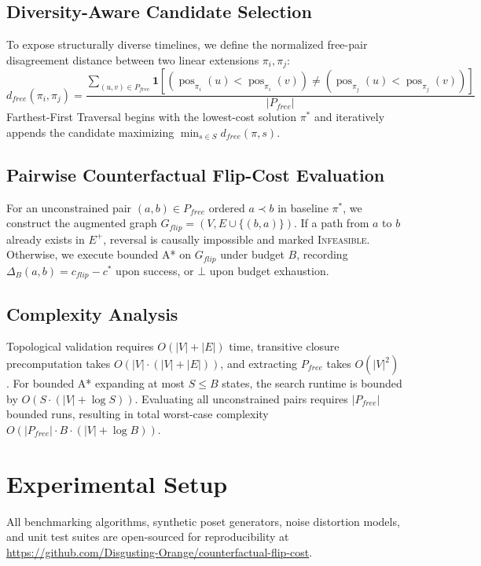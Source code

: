 \documentclass[journal]{IEEEtran}
\DeclareMathOperator{\pos}{pos}
\begin{document}
\subsection{Diversity-Aware Candidate Selection}
To expose structurally diverse timelines, we define the normalized free-pair disagreement distance between two linear extensions $\pi_i, \pi_j$:
\begin{equation}
d_{free}(\pi_i, \pi_j) = \frac{\sum_{(u, v) \in P_{free}} \mathbf{1}\left[ (\pos_{\pi_i}(u) < \pos_{\pi_i}(v)) \neq (\pos_{\pi_j}(u) < \pos_{\pi_j}(v)) \right]}{|P_{free}|}
\end{equation}
Farthest-First Traversal begins with the lowest-cost solution $\pi^*$ and iteratively appends the candidate maximizing $\min_{s \in S} d_{free}(\pi, s)$.

\subsection{Pairwise Counterfactual Flip-Cost Evaluation}
For an unconstrained pair $(a, b) \in P_{free}$ ordered $a \prec b$ in baseline $\pi^*$, we construct the augmented graph $G_{flip} = (V, E \cup \{(b, a)\})$. If a path from $a$ to $b$ already exists in $E^+$, reversal is causally impossible and marked \textsc{Infeasible}. Otherwise, we execute bounded A* on $G_{flip}$ under budget $B$, recording $\Delta_B(a, b) = c_{flip} - c^*$ upon success, or $\bot$ upon budget exhaustion.

\subsection{Complexity Analysis}
Topological validation requires $O(|V| + |E|)$ time, transitive closure precomputation takes $O(|V| \cdot (|V| + |E|))$, and extracting $P_{free}$ takes $O(|V|^2)$. For bounded A* expanding at most $S \le B$ states, the search runtime is bounded by $O(S \cdot (|V| + \log S))$. Evaluating all unconstrained pairs requires $|P_{free}|$ bounded runs, resulting in total worst-case complexity $O(|P_{free}| \cdot B \cdot (|V| + \log B))$.

\section{Experimental Setup}
\label{sec:experimental_setup}

All benchmarking algorithms, synthetic poset generators, noise distortion models, and unit test suites are open-sourced for reproducibility at \url{https://github.com/Disgusting-Orange/counterfactual-flip-cost}.
\end{document}
